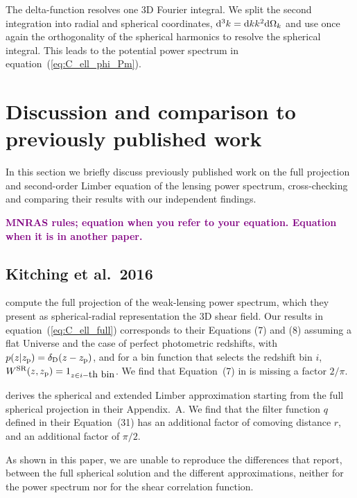 \documentclass[fleqn,usenatbib]{mnras} %
\newcommand{\ch}[1]{\textcolor{purple}{\bf #1}}
\begin{document}
\begin{appendix}
The delta-function resolves one 3D Fourier
integral. We split the second integration into radial and spherical
coordinates, ${\rm d}^3 k = {\rm d} k k^2 {\rm d} \Omega_k$ and use once again
the orthogonality of the spherical harmonics to resolve the spherical integral. 
This leads to the potential power spectrum in equation~(\ref{eq:C_ell_phi_Pm}).




\section{Discussion and comparison to previously published work}
\label{app:B}

In this section we briefly discuss previously published work on the full
projection and second-order Limber equation of the lensing power spectrum, cross-checking and comparing their
results with our independent findings.

\ch{MNRAS rules;  equation when you refer to your equation.  Equation when it is in another paper.}

\subsection{Kitching et al.~2016}

\cite{2016arXiv161104954K} compute the full projection of the weak-lensing
power spectrum, which they present as spherical-radial representation the 3D
shear field. Our results in equation~(\ref{eq:C_ell_full}) corresponds to their Equations
(7) and (8) assuming a flat Universe and the case of perfect photometric
redshifts, with $p(z | z_{\rm p}) = \delta_{\rm D}(z - z_{\rm p})$, and for a bin
function that selects the redshift bin $i$, $W^{\rm SR}(z, z_{\rm p}) = 1_{z
\in i-\mbox{th bin}}$. We find that Equation~(7) in \cite{2016arXiv161104954K} is missing a factor $2/\pi$.

\cite{2016arXiv161104954K} derives the spherical and extended Limber
approximation starting from the full spherical projection in their Appendix.~A.  We find that the
filter function $q$ defined in their Equation~(31) has an additional factor of
comoving distance $r$, and an additional factor of $\pi/2$.

As shown in this paper, we are unable to reproduce the differences that \cite{2016arXiv161104954K} report,
between the full spherical solution and the different approximations,
neither for the power spectrum nor for the shear correlation function.



\end{appendix}
\end{document}
